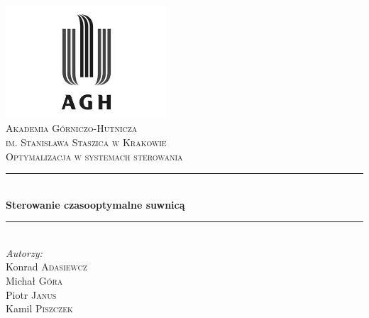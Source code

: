 \begin{titlepage}

\newcommand{\HRule}{\rule{\linewidth}{0.5mm}}

\center
 

\includegraphics[width=6cm]{../res/img/logo.png}\\[1cm]
 
 

\textsc{\LARGE Akademia Górniczo-Hutnicza \\[0.2cm]
im. Stanisława Staszica w Krakowie}\\[1.5cm]

\textsc{\Large Optymalizacja w systemach sterowania}\\[0.5cm]


\HRule \\[0.5cm]
{ \huge \bfseries Sterowanie czasooptymalne suwnicą}\\[0.3cm]
\HRule \\[1.5cm]

\flushright
\Large \emph{Autorzy:}\\
Konrad \textsc{Adasiewcz}\\[0.1cm]  %
Michał \textsc{Góra}\\[0.1cm]        %
Piotr \textsc{Janus}\\[0.1cm]  %
Kamil \textsc{Piszczek}\\[3cm]        %


\end{titlepage}

